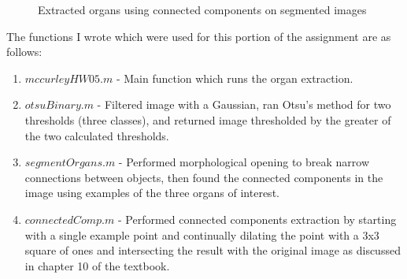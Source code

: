 \documentclass{article}[12 pt]
\begin{document}
\begin{figure}[H]
\captionsetup[subfloat]{labelformat=empty}
\centering
{} 
\caption{Extracted organs using connected components on segmented images}
\label{exCC}
\end{figure}

\noindent
The functions I wrote which were used for this portion of the assignment are as follows:
\begin{enumerate}
\item $mccurleyHW05.m$ - Main function which runs the organ extraction.
\item $otsuBinary.m$ - Filtered image with a Gaussian, ran Otsu's method for two thresholds (three classes), and returned image thresholded by the greater of the two calculated thresholds.
\item $segmentOrgans.m$ - Performed morphological opening to break  narrow connections between objects, then found the connected components in the image using examples of the three organs of interest.
\item $connectedComp.m$ - Performed connected components extraction by starting with a single example point and continually dilating the point with a 3x3 square of ones and intersecting the result with the original image as discussed in chapter 10 of the textbook.
\end{enumerate}
\end{document}

